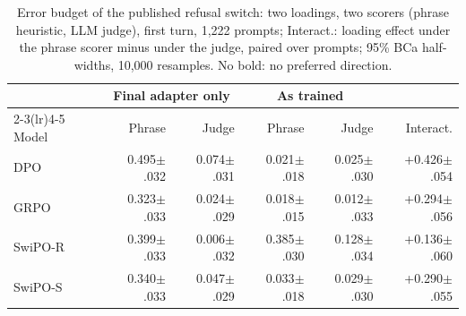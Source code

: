 \begin{table}[t]
\centering
\footnotesize
\setlength{\tabcolsep}{1.3pt}  %
\begin{tabular}{lrrrrr}
\toprule
 & \multicolumn{2}{c}{Final adapter only} & \multicolumn{2}{c}{As trained} & \\
\cmidrule(lr){2-3}\cmidrule(lr){4-5}
Model & Phrase & Judge & Phrase & Judge & Interact. \\
\midrule
DPO & 0.495{\tiny$\pm$.032} & 0.074{\tiny$\pm$.031} & 0.021{\tiny$\pm$.018} & 0.025{\tiny$\pm$.030} & +0.426{\tiny$\pm$.054} \\
GRPO & 0.323{\tiny$\pm$.033} & 0.024{\tiny$\pm$.029} & 0.018{\tiny$\pm$.015} & 0.012{\tiny$\pm$.033} & +0.294{\tiny$\pm$.056} \\
\mbox{SwiPO-R} & 0.399{\tiny$\pm$.033} & 0.006{\tiny$\pm$.032} & 0.385{\tiny$\pm$.030} & 0.128{\tiny$\pm$.034} & +0.136{\tiny$\pm$.060} \\
\mbox{SwiPO-S} & 0.340{\tiny$\pm$.033} & 0.047{\tiny$\pm$.029} & 0.033{\tiny$\pm$.018} & 0.029{\tiny$\pm$.030} & +0.290{\tiny$\pm$.055} \\
\bottomrule
\end{tabular}
\caption{Error budget of the published refusal switch: two loadings, two scorers (phrase heuristic, LLM judge), first turn, 1,222 prompts; Interact.: loading effect under the phrase scorer minus under the judge, paired over prompts; 95\% BCa half-widths, 10,000 resamples. No bold: no preferred direction.}
\label{tab:budget}
\end{table}

